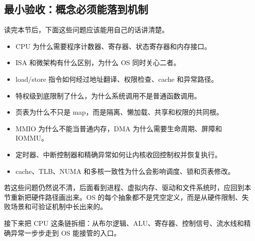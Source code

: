 \subsection{最小验收：概念必须能落到机制}

读完本节后，下面这些问题应该能用自己的话讲清楚。

\begin{rubricbox}
\begin{itemize}
\tightlist
\item CPU 为什么需要程序计数器、寄存器、状态寄存器和内存接口。
\item ISA 和微架构有什么区别，为什么 OS 同时关心二者。
\item load/store 指令如何经过地址翻译、权限检查、cache 和异常路径。
\item 特权级到底限制了什么，为什么系统调用不是普通函数调用。
\item 页表为什么不只是 map，而是隔离、懒加载、共享和权限的共同根。
\item MMIO 为什么不能当普通内存，DMA 为什么需要生命周期、屏障和 IOMMU。
\item 定时器、中断控制器和精确异常如何让内核收回控制权并恢复执行。
\item cache、TLB、NUMA 和多核一致性为什么会影响调度、锁和页表修改。
\end{itemize}
\end{rubricbox}

若这些问题仍然说不清，后面看到进程、虚拟内存、驱动和文件系统时，应回到本节重新把硬件路径画出来。OS 的每个抽象都不是凭空定义，而是从硬件限制、失败场景和可验证机制中长出来的。

接下来把 CPU 这条链拆细：从布尔逻辑、ALU、寄存器、控制信号、流水线和精确异常一步步走到 OS 能接管的入口。

